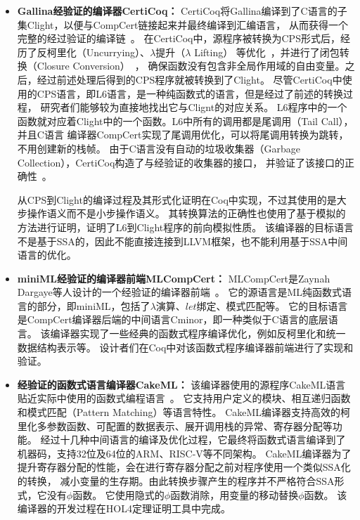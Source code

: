 \begin{itemize}
    \item \textbf{Gallina经验证的编译器CertiCoq：} 
    CertiCoq将Gallina编译到了C语言的子集Clight，以便与CompCert链接起来并最终编译到汇编语言，
    从而获得一个完整的经过验证的编译链~\cite{belanger2019certified,zoe-oopsla2021,zoe-icfp2021}。
    在CertiCoq中，源程序被转换为CPS形式后，经历了反柯里化（Uncurrying）、$\lambda$提升（$\lambda$ Lifting）
    等优化~\cite{li2018verifying}，并进行了闭包转换（Closure Conversion）~\cite{paraskevopoulou2019closure}，
    确保函数没有包含非全局作用域的自由变量。之后，经过前述处理后得到的CPS程序就被转换到了Clight。
    尽管CertiCoq中使用的CPS语言，即L6语言，是一种纯函数式的语言，但是经过了前述的转换过程，
    研究者们能够较为直接地找出它与Clignt的对应关系。
    L6程序中的一个函数就对应着Clight中的一个函数。L6中所有的调用都是尾调用（Tail Call），并且C语言
    编译器CompCert实现了尾调用优化，可以将尾调用转换为跳转，不用创建新的栈帧。
    由于C语言没有自动的垃圾收集器（Garbage Collection），CertiCoq构造了与经验证的收集器的接口，
    并验证了该接口的正确性~\cite{wang2019certifying}。

    从CPS到Clight的编译过程及其形式化证明在Coq中实现，不过其使用的是大步操作语义而不是小步操作语义。
    其转换算法的正确性也使用了基于模拟的方法进行证明，证明了L6到Clight程序的前向模拟性质。
    该编译器的目标语言不是基于SSA的，因此不能直接连接到LLVM框架，也不能利用基于SSA中间语言的优化。
    \item \textbf{miniML经验证的编译器前端MLCompCert：} 
    MLCompCert是Zaynah Dargaye等人设计的一个经验证的编译器前端~\cite{dargaye2009verification}。
    它的源语言是ML纯函数式语言的部分，即miniML，包括了$\lambda$演算、$let$绑定、模式匹配等。
    它的目标语言是CompCert编译器后端的中间语言Cminor，即一种类似于C语言的底层语言。
    该编译器实现了一些经典的函数式程序编译优化，例如反柯里化和统一数据结构表示等。
    设计者们在Coq中对该函数式程序编译器前端进行了实现和验证。
    \item \textbf{经验证的函数式语言编译器CakeML：} 
    该编译器使用的源程序CakeML语言贴近实际中使用的函数式编程语言~\cite{cakeml2016}。
    它支持用户定义的模块、相互递归函数和模式匹配（Pattern Matching）等语言特性。
    CakeML编译器支持高效的柯里化多参数函数、可配置的数据表示、展开调用栈的异常、寄存器分配等功能。
    经过十几种中间语言的编译及优化过程，它最终将函数式语言编译到了机器码，支持32位及64位的ARM、RISC-V等不同架构。
    CakeML编译器为了提升寄存器分配的性能，会在进行寄存器分配之前对程序使用一个类似SSA化的转换，
    减小变量的生存期。由此转换步骤产生的程序并不严格符合SSA形式，它没有$\phi$函数。
    它使用隐式的$\phi$函数消除，用变量的移动替换$\phi$函数。
    该编译器的开发过程在HOL4定理证明工具中完成。
\end{itemize}



